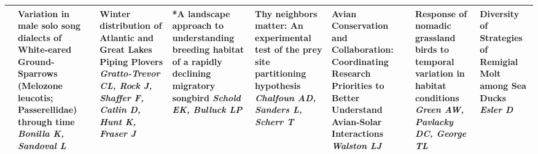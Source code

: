 \begin{tabular}{|x{0.85cm}|a{2.85cm}|x{2.85cm}|x{2.85cm}|x{2.85cm}|a{2.85cm}|a{2.85cm}|a{2.85cm}|}
\hline
{}&Variation in male solo song dialects of White-eared Ground-Sparrows (Melozone leucotis; Passerellidae) through time \newline \newline \textit{Bonilla K, Sandoval L} & Winter distribution of Atlantic and Great Lakes Piping Plovers \newline \newline \textit{Gratto-Trevor CL, Rock J, Shaffer F, Catlin D, Hunt K, Fraser J} & *A landscape approach to understanding breeding habitat of a rapidly declining migratory songbird \newline \newline \textit{Schold EK, Bulluck LP} & Thy neighbors matter: An experimental test of the prey site partitioning hypothesis \newline \newline \textit{Chalfoun AD, Sanders L, Scherr T} & Avian Conservation and Collaboration: Coordinating Research Priorities to Better Understand Avian-Solar Interactions \newline \newline \textit{Walston LJ} & Response of nomadic grassland birds to temporal variation in habitat conditions \newline \newline \textit{Green AW, Pavlacky DC, George TL} & Diversity of Strategies of Remigial Molt among Sea Ducks \newline \newline \textit{Esler D}\\
\hline

\end{tabular}
